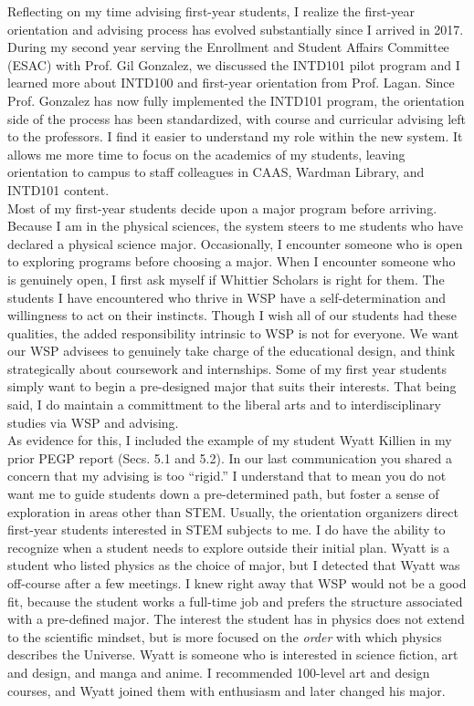 \documentclass[../../main.tex]{subfiles}
\begin{document}
Reflecting on my time advising first-year students, I realize the first-year orientation and advising process has evolved substantially since I arrived in 2017.  During my second year serving the Enrollment and Student Affairs Committee (ESAC) with Prof. Gil Gonzalez, we discussed the INTD101 pilot program and I learned more about INTD100 and first-year orientation from Prof. Lagan.  Since Prof. Gonzalez has now fully implemented the INTD101 program, the orientation side of the process has been standardized, with course and curricular advising left to the professors.  I find it easier to understand my role within the new system.  It allows me more time to focus on the academics of my students, leaving orientation to campus to staff colleagues in CAAS, Wardman Library, and INTD101 content.  
\\
\vspace{0.25cm}
Most of my first-year students decide upon a major program before arriving.  Because I am in the physical sciences, the system steers to me students who have declared a physical science major.  Occasionally, I encounter someone who is open to exploring programs before choosing a major.  When I encounter someone who is genuinely open, I first ask myself if Whittier Scholars is right for them.  The students I have encountered who thrive in WSP have a self-determination and willingness to act on their instincts.  Though I wish all of our students had these qualities, the added responsibility intrinsic to WSP is not for everyone.  We want our WSP advisees to genuinely take charge of the educational design, and think strategically about coursework and internships.  Some of my first year students simply want to begin a pre-designed major that suits their interests.  That being said, I do maintain a committment to the liberal arts and to interdisciplinary studies via WSP and advising.
\\
\vspace{0.25cm}
As evidence for this, I included the example of my student Wyatt Killien in my prior PEGP report (Secs. 5.1 and 5.2).  In our last communication you shared a concern that my advising is too ``rigid.''  I understand that to mean you do not want me to guide students down a pre-determined path, but foster a sense of exploration in areas other than STEM.  Usually, the orientation organizers direct first-year students interested in STEM subjects to me.  I do have the ability to recognize when a student needs to explore outside their initial plan.  Wyatt is a student who listed physics as the choice of major, but I detected that Wyatt was off-course after a few meetings.  I knew right away that WSP would not be a good fit, because the student works a full-time job and prefers the structure associated with a pre-defined major.  The interest the student has in physics does not extend to the scientific mindset, but is more focused on the \textit{order} with which physics describes the Universe.  Wyatt is someone who is interested in science fiction, art and design, and manga and anime.  I recommended 100-level art and design courses, and Wyatt joined them with enthusiasm and later changed his major.  
\end{document}
